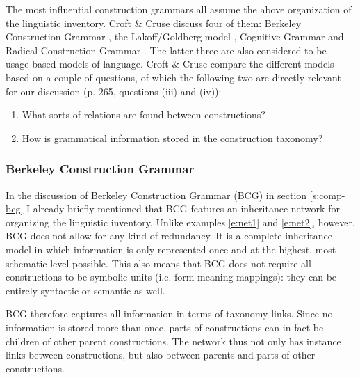 The most influential construction grammars all assume the above organization of the linguistic inventory. Croft \& Cruse discuss four of them: Berkeley Construction Grammar \citep{kay99grammatical}, the Lakoff/Goldberg model \citep{goldberg95construction}, Cognitive Grammar \citep{langacker87foundations} and Radical Construction Grammar \citep{croft01radical}. The latter three are also considered to be usage-based models of language. Croft \& Cruse compare the different models based on a couple of questions, of which the following two are directly relevant for our discussion (p. 265, questions (iii) and (iv)):

\begin{enumerate}
\item What sorts of relations are found between constructions?
\item How is grammatical information stored in the construction taxonomy?
\end{enumerate}

\subsubsection{Berkeley Construction Grammar}
In the discussion of Berkeley Construction Grammar (BCG) in section \ref{s:comp-bcg} I already briefly mentioned that BCG features an inheritance network for organizing the linguistic inventory. Unlike examples \ref{e:net1} and \ref{e:net2}, however, BCG does not allow for any kind of  redundancy. It is a complete inheritance model in which information is only represented once and at the highest, most schematic level possible. This also means that BCG does not require all constructions to be symbolic units (i.e. form-meaning mappings): they can be entirely syntactic or semantic as well.

BCG therefore captures all information in terms of taxonomy links. Since no information is stored more than once, parts of constructions can in fact be children of other parent constructions. The network thus not only has instance links between constructions, but also between parents and parts of other constructions.


